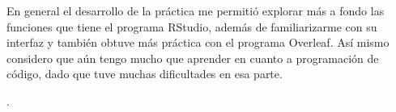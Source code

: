 \documentclass{article}
\begin{document}
\bigskip

En general el desarrollo de la práctica me permitió explorar más a fondo las funciones que tiene el programa RStudio, además de familiarizarme con su interfaz y también obtuve más práctica con el programa Overleaf. Así mismo considero que aún tengo mucho que aprender en cuanto a programación de código, dado que tuve muchas dificultades en esa parte.

\newpage
.
\bigskip
\bigskip



\end{document}
